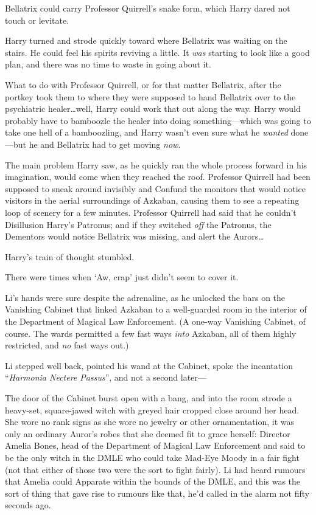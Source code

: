 Bellatrix could carry Professor Quirrell’s snake form, which Harry dared not touch or levitate.

Harry turned and strode quickly toward where Bellatrix was waiting on the stairs. He could feel his spirits reviving a little. It \emph{was} starting to look like a good plan, and there was no time to waste in going about it.

What to do with Professor Quirrell, or for that matter Bellatrix, after the portkey took them to where they were supposed to hand Bellatrix over to the psychiatric healer…well, Harry could work that out along the way. Harry would probably have to bamboozle the healer into doing something—which was going to take one hell of a bamboozling, and Harry wasn’t even sure what he \emph{wanted} done—but he and Bellatrix had to get moving \emph{now.}

The main problem Harry saw, as he quickly ran the whole process forward in his imagination, would come when they reached the roof. Professor Quirrell had been supposed to sneak around invisibly and Confund the monitors that would notice visitors in the aerial surroundings of Azkaban, causing them to see a repeating loop of scenery for a few minutes. Professor Quirrell had said that he couldn’t Disillusion Harry’s Patronus; and if they switched \emph{off} the Patronus, the Dementors would notice Bellatrix was missing, and alert the Aurors…

Harry’s train of thought stumbled.

There were times when ‘Aw, crap’ just didn’t seem to cover it.

\later

Li’s hands were sure despite the adrenaline, as he unlocked the bars on the Vanishing Cabinet that linked Azkaban to a well-guarded room in the interior of the Department of Magical Law Enforcement. (A one-way Vanishing Cabinet, of course. The wards permitted a few fast ways \emph{into} Azkaban, all of them highly restricted, and \emph{no} fast ways out.)

Li stepped well back, pointed his wand at the Cabinet, spoke the incantation “\emph{Harmonia Nectere Passus}”, and not a second later—

The door of the Cabinet burst open with a bang, and into the room strode a heavy-set, square-jawed witch with greyed hair cropped close around her head. She wore no rank signs as she wore no jewelry or other ornamentation, it was only an ordinary Auror’s robes that she deemed fit to grace herself: Director Amelia Bones, head of the Department of Magical Law Enforcement and said to be the only witch in the DMLE who could take Mad-Eye Moody in a fair fight (not that either of those two were the sort to fight fairly). Li had heard rumours that Amelia could Apparate within the bounds of the DMLE, and this was the sort of thing that gave rise to rumours like that, he’d called in the alarm not fifty seconds ago.

